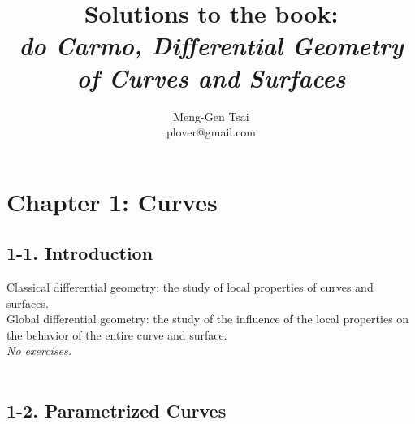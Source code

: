 \documentclass{article}
\title{\textbf{Solutions to the book: \\
\emph{do Carmo, Differential Geometry of Curves and Surfaces}}}
\author{Meng-Gen Tsai \\ plover@gmail.com}
\begin{document}
\maketitle
\tableofcontents






\newpage
\section*{Chapter 1: Curves \\}









\subsection*{1-1. Introduction \\}

Classical differential geometry: the study of local properties of
curves and surfaces. \\

Global differential geometry: the study of the influence of the local properties
on the behavior of the entire curve and surface. \\

\emph{No exercises.} \\\\






\subsection*{1-2. Parametrized Curves \\}
\end{document}
